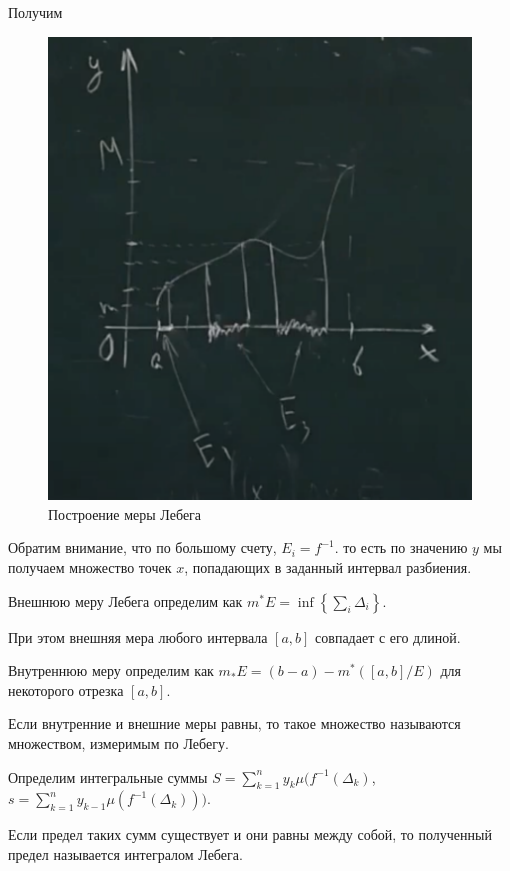 Получим
\begin{figure}[H]
    \centering
    \includegraphics[scale=0.5]{images/lebeg2.png}
    \caption{Построение меры Лебега}
\end{figure}

Обратим внимание, что по большому счету, $E_i = f^{-1}$. то
есть по значению $y$ мы получаем множество точек $x$, попадающих в заданный
интервал разбиения.
\begin{definition}
Внешнюю меру Лебега определим как $m^* E = \inf\left\{\sum\limits_i \Delta_i\right\}$.

При этом внешняя мера любого интервала $[a, b]$ совпадает с его длиной.
        
\end{definition}

\begin{definition}
Внутреннюю меру определим как $m_* E = (b - a) - m^*([a, b] / E)$ для
некоторого отрезка $[a, b]$.    
\end{definition}

Если внутренние и внешние меры равны, то такое множество называются множеством,
измеримым по Лебегу.

\begin{definition}
    Определим интегральные суммы $S = \sum\limits_{k = 1}^n y_k\mu(f^{-1}(\Delta_k)$, 
    $s = \sum\limits_{k = 1}^n y_{k - 1}\mu(f^{-1}(\Delta_k)))$.
    
    Если предел таких сумм существует и они равны между собой, то полученный 
    предел называется интегралом Лебега.
\end{definition}

